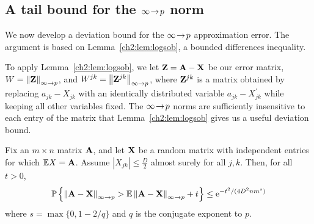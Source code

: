 \subsection{A tail bound for the $\infty\!\rightarrow\!p$ norm}
We now develop a deviation bound for the $\infty\!\rightarrow\!p$ approximation error. The
argument is based on Lemma~\ref{ch2:lem:logsob}, a bounded differences inequality.

To apply Lemma~\ref{ch2:lem:logsob}, we let $\mathbf{Z}=\mathbf{A}-\mathbf{X}$ be our
error matrix, $W=\left\|\mathbf{Z}\right\|_{\infty\rightarrow p}$, and
$W^{jk}=\left\|\mathbf{Z}^{jk}\right\|_{\infty\rightarrow p}$, where $\mathbf{Z}^{jk}$ is a
matrix obtained by replacing $a_{jk}-X_{jk}$ with an identically
distributed variable $a_{jk}-X_{jk}^{\prime}$ while keeping all other variables
fixed. The $\infty\!\rightarrow\!p$ norms are sufficiently insensitive to each entry of the
matrix that Lemma~\ref{ch2:lem:logsob} gives us a useful deviation bound.

\begin{thm}
Fix an $m \times n$ matrix $\mathbf{A}$, and let $\mathbf{X}$ be a random matrix with
independent entries for which $\mathbb{E} X = \mathbf{A}$. Assume
$\left|X_{jk}\right|\leq\frac{D}{2}$ almost surely for all $j,k$. Then, for all
$t>0$,
\[
\mathbb{P}\left\{\left\|\mathbf{A}-\mathbf{X}\right\|_{\infty\rightarrow p}>
\mathbb{E}\left\|\mathbf{A}-\mathbf{X}\right\|_{\infty\rightarrow p}+t\right\}\leq \mathrm{e}^{-t^{2}/(4D^{2}nm^{s})}
\]
where $s=\max\{0, 1-2/q\}$ and $q$ is the conjugate exponent to $p$. 
\label{ch2:thm:inftopnormdevbnd}
\end{thm}

